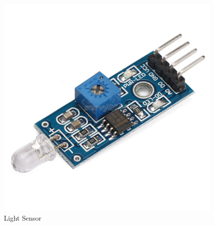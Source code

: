 \documentclass{article}
\begin{document}
\begin{flushleft}
\begin{figure}[H]
\begin{minipage}{.4\textwidth}
                        \includegraphics[height=1\linewidth]{./media/LightSensor.jpg}
                        \caption{Light Sensor}
        \end{minipage}\hfill
        \centering

\end{figure}

\end{flushleft}
\pagebreak
\end{document}
